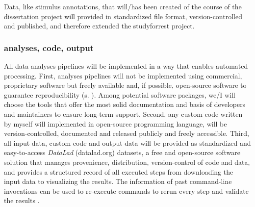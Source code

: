 \begin{comment} \citep{dupre2020nature}:
%
Study Forrest is a data collection and curation effort designed to serve as a
    community resource for new discoveries.
%
As of October 2019, 29 unique studies had been published using the
    studyforrest.org dataset, 17 of which were published without any of the
    original authors of the data release.
%
This is possible in large part thanks to the richness of naturalistic stimuli,
    where the same movie can be used for both task-free as well as
    stimulus-driven analyses, with the original stimulus re-annotated for
    particular features of interest.
%
For example, studyforrest.org has been used to test cerebrovascular biomarkers
    (Voss et al., 2017) but, among other features, was also annotated for
    expressed emotion (Labs et al., 2015) which later informed a study on
    emotion encoding gradients in the brain (Lettieri et al., 2019)''
    \citep{dupre2020nature}.
%
\end{comment}
%
Data, like stimulus annotations, that will/has been created of the course of the
dissertation project will provided in standardized file format,
version-controlled and published, and therefore extended the studyforrest
project.

%
\subsubsection{analyses, code, output}

%
All data analyses pipelines will be implemented in a way that enables automated
processing.
%
First, analyses pipelines will not be implemented using commercial, proprietary
software but freely available and, if possible, open-source software to
guarantee reproducibility (s. \citep{eglen2017toward}).
Among potential software packages, we/I will choose the tools that offer the
most solid documentation and basis of developers and maintainers to ensure
long-term support.
Second, any custom code written by myself will implemented in open-source
programming language, will be version-controlled, documented and released
publicly and freely accessible.
%
Third, all input data, custom code and output data will be provided as
standardized and easy-to-access \textit{DataLad} (datalad.org) datasets, a free
and open-source software solution that manages provenience, distribution,
version-control of code and data, and provides a structured record of all
executed steps from downloading the input data to visualizing the results. The information of past command-line invocations can be used to re-execute
commands to rerun every step and validate the results
\citep{halchenko2021datalad}.

